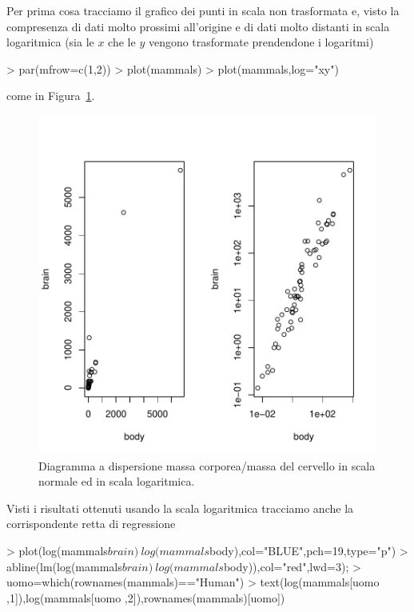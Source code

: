 \documentclass[onecolumn,12pt]{book}
\begin{document}
Per prima cosa tracciamo il grafico dei punti  in scala non trasformata e, visto la compresenza di dati molto prossimi all'origine e di dati molto distanti in scala logaritmica (sia le $x$ che le $y$ vengono trasformate prendendone i logaritmi)
\begin{Schunk}
\begin{Sinput}
> par(mfrow=c(1,2))
> plot(mammals)
> plot(mammals,log="xy")
\end{Sinput}
\end{Schunk}
come in Figura~\ref{fig:duemammals}.\begin{figure}[htbp]
\begin{center}
\includegraphics{RbookParte2-141}
\caption{Diagramma a dispersione massa corporea/massa del cervello in scala normale ed in scala logaritmica. }
\label{fig:duemammals}
\end{center}
\end{figure}
Visti i  risultati ottenuti usando la scala logaritmica tracciamo anche la corrispondente retta di regressione
\begin{Schunk}
\begin{Sinput}
> plot(log(mammals$brain)~log(mammals$body),col="BLUE",pch=19,type="p")
> abline(lm(log(mammals$brain)~ log(mammals$body)),col="red",lwd=3);
> uomo=which(rownames(mammals)=="Human")
> text(log(mammals[uomo ,1]),log(mammals[uomo ,2]),rownames(mammals)[uomo])
\end{Sinput}
\end{Schunk}
\end{document}
